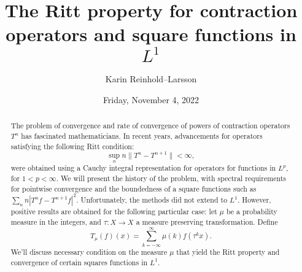 \documentclass[colloquium]{UAmathtalk}
\author{Karin Reinhold--Larsson}
\title{The Ritt property for contraction operators  and square functions in $L^1$}
\date{Friday, November 4, 2022}
\begin{document}
\maketitle

\begin{abstract}
The problem of convergence and rate of convergence of powers of contraction operators $T^n$  has fascinated mathematicians. 
In recent years, advancements  for operators satisfying the following Ritt condition: \[\sup_n n \|T^n-T^{n+1}\|<\infty,\] 
 were obtained using a Cauchy integral representation for operators for functions in $L^p$, 
 for $1<p<\infty$.   We will present the history of the problem, with spectral requirements for pointwise convergence and the boundedness of a square functions such as  $\sum_n n |T^nf-T^{n+1}f|^2$. 
Unfortunately, the methods did not extend to $L^1$. However, positive results are obtained for the following particular case:
let  $\mu$ be a probability measure in the integers, and  $\tau:X \to X$  a measure preserving transformation. 
Define \[T_{\mu} (f)(x)= \sum_{k=-\infty}^{\infty} \mu(k) f(\tau^k x).\] 
We'll discuss necessary condition on the measure $\mu$ that yield the Ritt property and convergence of certain squares functions in $L^1$.
\end{abstract}
\end{document}

